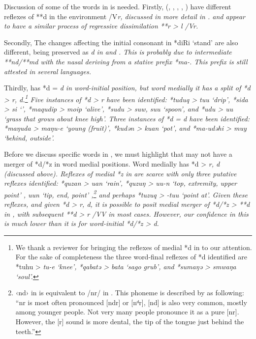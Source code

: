 Discussion of some of the words in  is needed.
Firstly,  (, ,
, , ) have different reflexes of **d in the
environment /{\gap}V\it{r}, discussed in more detail in .
 and  appear to have a similar process of regressive
dissimilation **r > \it{l} /{\gap}\it{Vr}.

Secondly, The changes affecting the initial consonant in *diRi
‘stand’ are also different,
being preserved as \it{d} in  and .
This is probably due to intermediate **nd/**md with the nasal
deriving from a stative prefix *ma-.
This prefix is still attested in several languages.

Thirdly,  has *d = \it{d} in word-initial position,
but word medially it has a split of *d > \it{r,
d}.\footnote{
		We thank a reviewer for bringing the reflexes of
		medial *d in  to our attention.
		For the sake of completeness the three word-final reflexes of
		*d identified are *tuhu > \it{tu-e} ‘knee’,
		*qabatə > \it{bata} ‘sago grub’,
		and *sumaŋə > \it{smwaŋa} ‘soul’.}
Five instances
of *d > \it{r} have been identified: *tuduq > \it{tuu}
‘drip’,  *sida > \it{si} ‘’,
*maqudip > \it{moip} ‘alive’,
*sudu > \it{suw, suu} ‘spoon’,
and  *udu > \it{uu} ‘grass that grows about knee high’.
Three instances of *d = \it{d} have been identified: *maŋuda
> \it{maŋu-e} ‘young (fruit)’,
*kudən > \it{kuan} ‘pot’,
and *ma-udəhi > \it{muy} ‘behind, outside’.

Before we discuss specific words in ,
we must highlight that  may not have a merger of *d/*z
in word medial positions.
Word medially  has *d > \it{r, d} (discussed above).
Reflexes of medial *z in  are scarce with only three putative
reflexes identified: *quzan > \it{uan} ‘rain’,
*quzuŋ > \it{uu-n} ‘top,
extremity, upper point’ \citep[115]{Drabbe1932b}, \it{uun}
‘tip, end, point’ \citep{MettlerMettler1996},\footnote{
		 ‹nd›
		in \citet{Drabbe1932b} is equivalent to /nr/ in
		\citet{MettlerMettler1996,MettlerMettler1997}.
		This phoneme is described by \citet{MettlerMettler1997} as following:
		“nr is most often pronounced [ndr] or [nᵈr],
		[nd] is also very common,
		mostly among younger people.
		Not very many people pronounce it as a pure [nr].
		However, the [r] sound is more dental,
		the tip of the tongue just behind the teeth.”} 
and perhaps *tuzuq > \it{-tuu} ‘point at’.
Given these reflexes, and given *d > \it{r,
d}, it is possible to posit medial merger of *d/*z > **d in ,
with subsequent **d > \it{r} /V{\gap}V in most cases.
However, our confidence in this is much lower than it is for
word-initial *d/*z > \it{d}.

